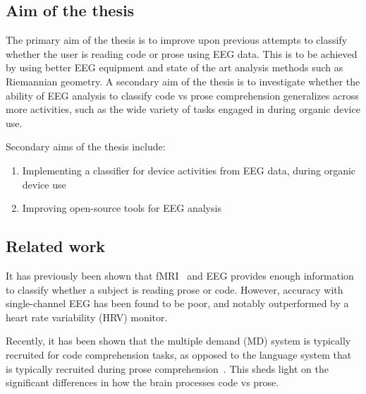 \documentclass[a4paper]{article}
\begin{document}
\begin{refsection}

\subsection{Aim of the thesis}

    The primary aim of the thesis is to improve upon previous attempts\cite{fucci_replication_2019} to classify whether the user is reading code or prose using EEG data. This is to be achieved by using better EEG equipment and state of the art analysis methods such as Riemannian geometry. A secondary aim of the thesis is to investigate whether the ability of EEG analysis to classify code vs prose comprehension generalizes across more activities, such as the wide variety of tasks engaged in during organic device use.

    Secondary aims of the thesis include:

    \begin{enumerate}
        \item Implementing a classifier for device activities from EEG data, during organic device use
        \item Improving open-source tools for EEG analysis
    \end{enumerate}


\subsection{Related work}

    It has previously been shown that fMRI~\cite{floyd_decoding_2017} and EEG\cite{fucci_replication_2019} provides enough information to classify whether a subject is reading prose or code. However, accuracy with single-channel EEG has been found to be poor, and notably outperformed by a heart rate variability (HRV) monitor.

    Recently, it has been shown that the multiple demand (MD) system is typically recruited for code comprehension tasks, as opposed to the language system that is typically recruited during prose comprehension~\cite{ivanova_comprehension_2020}. This sheds light on the significant differences in how the brain processes code vs prose.


\end{refsection}
\end{document}
